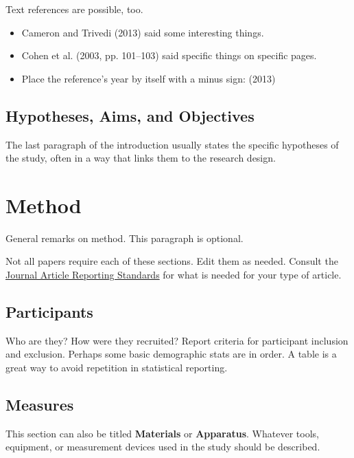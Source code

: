 \documentclass[
  man,
  colorlinks=true,linkcolor=blue,citecolor=blue,urlcolor=blue]{apa7}
\begin{document}
Text references are possible, too.

\begin{itemize}
\item
  Cameron and Trivedi (2013) said some interesting things.
\item
  Cohen et al. (2003, pp. 101--103) said specific things on specific
  pages.
\item
  Place the reference's year by itself with a minus sign: (2013)
\end{itemize}

\hypertarget{hypotheses-aims-and-objectives}{%
\subsection{Hypotheses, Aims, and
Objectives}\label{hypotheses-aims-and-objectives}}

The last paragraph of the introduction usually states the specific
hypotheses of the study, often in a way that links them to the research
design.

\hypertarget{method}{%
\section{Method}\label{method}}

General remarks on method. This paragraph is optional.

Not all papers require each of these sections. Edit them as needed.
Consult the \href{https://apastyle.apa.org/jars}{Journal Article
Reporting Standards} for what is needed for your type of article.

\hypertarget{participants}{%
\subsection{Participants}\label{participants}}

Who are they? How were they recruited? Report criteria for participant
inclusion and exclusion. Perhaps some basic demographic stats are in
order. A table is a great way to avoid repetition in statistical
reporting.

\hypertarget{measures}{%
\subsection{Measures}\label{measures}}

This section can also be titled \textbf{Materials} or
\textbf{Apparatus}. Whatever tools, equipment, or measurement devices
used in the study should be described.
\end{document}
